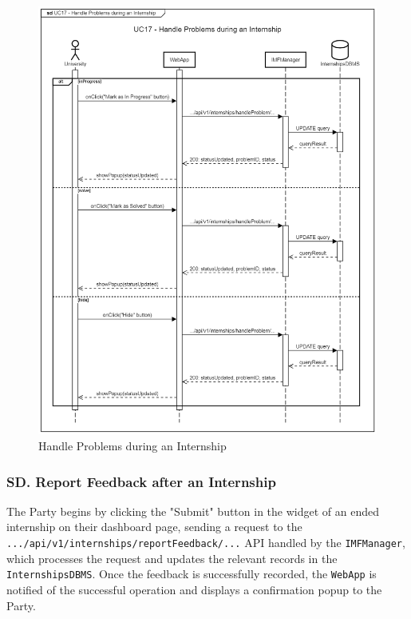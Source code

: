 \begin{figure}[H]
    \begin{center}
         \includegraphics[width=0.75\linewidth]{LaTeXCode/images/SequenceDiagrams/UC17-sequenceDiagram.png}
         \caption{Handle Problems during an Internship}
         \label{fig:handle_problems_sd}
     \end{center}
\end{figure}

\newpage

\subsubsection*{SD\cuc. Report Feedback after an Internship}
\label{subsubsec:report_feedback_sd}
The Party begins by clicking the "Submit" button in the widget of an ended internship on their dashboard page, sending a request to the \texttt{.../api/v1/internships/reportFeedback/...} API handled by the \texttt{IMFManager}, which processes the request and updates the relevant records in the \texttt{InternshipsDBMS}. Once the feedback is successfully recorded, the \texttt{WebApp} is notified of the successful operation and displays a confirmation popup to the Party.


